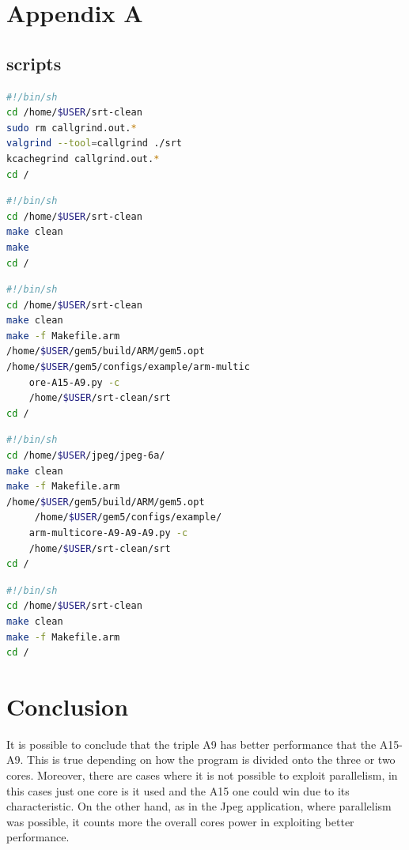 \documentclass[journal]{IEEEtran}
\begin{document}
\section{Appendix A}
\subsection{scripts}
\begin{lstlisting}[language=bash,caption={bash}]
#!/bin/sh
cd /home/$USER/srt-clean
sudo rm callgrind.out.*
valgrind --tool=callgrind ./srt
kcachegrind callgrind.out.*
cd /
\end{lstlisting}

\begin{lstlisting}[language=bash,caption={bash}]
#!/bin/sh
cd /home/$USER/srt-clean
make clean
make
cd /
\end{lstlisting}

\begin{lstlisting}[language=bash,caption={bash}]
#!/bin/sh
cd /home/$USER/srt-clean
make clean
make -f Makefile.arm
/home/$USER/gem5/build/ARM/gem5.opt
/home/$USER/gem5/configs/example/arm-multic
	ore-A15-A9.py -c
	/home/$USER/srt-clean/srt
cd /
\end{lstlisting}

\begin{lstlisting}[language=bash,caption={bash}]
#!/bin/sh
cd /home/$USER/jpeg/jpeg-6a/
make clean
make -f Makefile.arm
/home/$USER/gem5/build/ARM/gem5.opt
	 /home/$USER/gem5/configs/example/
	arm-multicore-A9-A9-A9.py -c 
	/home/$USER/srt-clean/srt
cd /
\end{lstlisting}


\begin{lstlisting}[language=bash,caption={bash}]
#!/bin/sh
cd /home/$USER/srt-clean
make clean
make -f Makefile.arm
cd /
\end{lstlisting}



\section{Conclusion}
It is possible to conclude that the triple A9 has better performance that the A15-A9. This is true depending on how the program is divided onto the three or two cores. Moreover, there are cases where it is not possible to exploit parallelism, in this cases just one core is it used and the A15 one could win due to its characteristic. On the other hand, as in the Jpeg application, where parallelism was possible, it counts more the overall cores power in exploiting better performance. 
\end{document}

